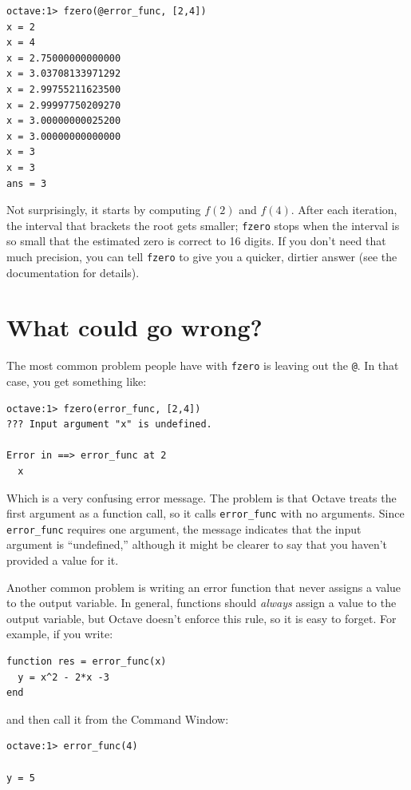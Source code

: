 \documentclass{book}
\begin{document}
\begin{verbatim}
octave:1> fzero(@error_func, [2,4])
x = 2
x = 4
x = 2.75000000000000
x = 3.03708133971292
x = 2.99755211623500
x = 2.99997750209270
x = 3.00000000025200
x = 3.00000000000000
x = 3
x = 3
ans = 3
\end{verbatim}

Not surprisingly, it starts by computing $f(2)$ and $f(4)$. After
each iteration, the interval that brackets the root gets smaller;
{\tt fzero} stops when the interval is so small that the estimated
zero is correct to 16 digits. If you
don't need that much precision, you can tell {\tt fzero} to give
you a quicker, dirtier answer (see the documentation for details).


\section{What could go wrong?}

The most common problem people have with {\tt fzero} is leaving
out the {\tt @}. In that case, you get something like:

\begin{verbatim}
octave:1> fzero(error_func, [2,4])
??? Input argument "x" is undefined.

Error in ==> error_func at 2
  x
\end{verbatim}

Which is a very confusing error message. The problem is that Octave
treats the first argument as a function call, so it calls {\tt error\_func}
with no arguments. Since {\tt error\_func} requires one argument, the
message indicates that the input argument is ``undefined,'' although
it might be clearer to say that you haven't provided a value for it.

Another common problem is writing an error function that never
assigns a value to the output variable. In general, functions should
{\em always} assign a value to the output variable, but Octave doesn't
enforce this rule, so it is easy to forget. For example, if you
write:

\begin{verbatim}
function res = error_func(x)
  y = x^2 - 2*x -3
end
\end{verbatim}

and then call it from the Command Window:

\begin{verbatim}
octave:1> error_func(4)

y = 5
\end{verbatim}
\end{document}
